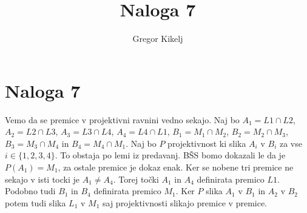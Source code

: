 \documentclass[12pt]{article}
\title{Naloga 7}
\author{Gregor Kikelj}
\begin{document}
\section{Naloga 7}
Vemo da se premice v projektivni ravnini vedno sekajo. Naj bo $A_1=L1\cap L2$, $A_2=L2\cap L3$, $A_3=L3\cap L4$, $A_4=L4\cap L1$,
$B_1=M_1\cap M_2$, $B_2=M_2\cap M_3$, $B_3=M_3\cap M_4$ in $B_4=M_4\cap M_1$. Naj bo $P$ projektivnost ki slika $A_i$ v $B_i$ za vse $i\in \{1, 2, 3, 4\}$.
To obstaja po lemi iz predavanj. BŠS bomo dokazali le da je $P(A_1)=M_1$, za ostale premice je dokaz enak. Ker se nobene tri premice ne sekajo v isti tocki je 
$A_1\neq A_4$. Torej točki $A_1$ in $A_4$ definirata premico $L1$. Podobno tudi $B_1$ in $B_4$ definirata premico $M_1$. Ker $P$ slika $A_1$ v $B_1$ in $A_2$ v $B_2$
potem tudi slika $L_1$ v $M_1$ saj projektivnosti slikajo premice v premice.
\end{document}
